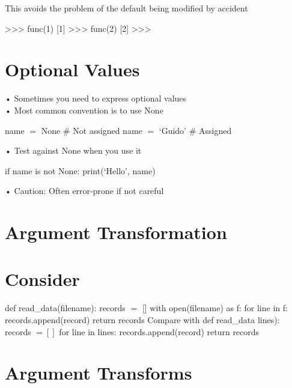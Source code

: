 \documentclass[
  letterpaper,
  DIV=11,
  numbers=noendperiod]{scrreprt}
\newenvironment{Shaded}{\begin{snugshade}}{\end{snugshade}}
\newcommand{\NormalTok}[1]{\textcolor[rgb]{0.00,0.23,0.31}{#1}}
\begin{document}
This avoids the problem of the default being modified by accident

\begin{Shaded}
\begin{Highlighting}[]
\NormalTok{\textgreater{}\textgreater{}\textgreater{} func(1)  }
\NormalTok{[1]  }
\NormalTok{\textgreater{}\textgreater{}\textgreater{} func(2)  }
\NormalTok{[2]  }
\NormalTok{\textgreater{}\textgreater{}\textgreater{} }
\end{Highlighting}
\end{Shaded}


\chapter{Optional Values}\label{optional-values}

• Sometimes you need to express optional values\\
• Most common convention is to use None

name \(=\) None \# Not assigned name \(=\) `Guido' \# Assigned

• Test against None when you use it

if name is not None: print(`Hello', name)

• Caution: Often error-prone if not careful


\chapter{Argument Transformation}\label{argument-transformation}


\chapter{Consider}\label{consider}

def read\_data(filename): records \(=\) {[}{]} with open(filename) as f:
for line in f: records.append(record) return records Compare with def
read\_data lines): records \(= [ ]\) for line in lines:
records.append(record) return records


\chapter{Argument Transforms}\label{argument-transforms}
\end{document}
